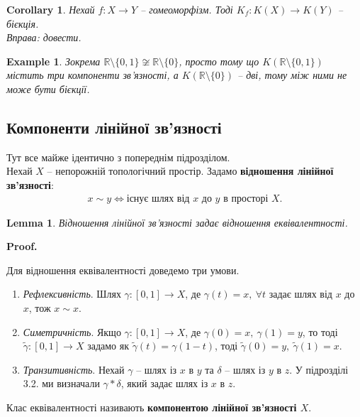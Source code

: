 \documentclass[a4paper, 10pt]{article}
\makeatletter
\theoremstyle{theoremdd}
\newtheorem{example}[theorem]{Example}
\newtheorem{lemma}[theorem]{Lemma}
\newtheorem{corollary}[theorem]{Corollary}
\renewenvironment{proof}[1][Proof.\\]{\par
\pushQED{\hfill \qed}%
\normalfont \topsep6\p@\@plus6\p@\relax
\trivlist
\item\relax
{\bfseries
#1\@addpunct{.}}\hspace\labelsep\ignorespaces
}{%
\popQED\endtrivlist\@endpefalse
}
\makeatother
\begin{document}
\begin{corollary}
Нехай $f \colon X \to Y$ -- гомеоморфізм. Тоді $K_f \colon K(X) \to K(Y)$ -- бієкція.\\
\textit{Вправа: довести.}
\end{corollary}

\begin{example}
Зокрема $\mathbb{R} \setminus \{0,1\} \not\cong \mathbb{R} \setminus \{0\}$, просто тому що $K(\mathbb{R} \setminus \{0,1\})$ містить три компоненти зв'язності, а $K(\mathbb{R} \setminus \{0\})$ -- дві, тому між ними не може бути бієкції.
\end{example}

\subsection{Компоненти лінійної зв'язності}
Тут все майже ідентично з попереднім підрозділом.\\
Нехай $X$ -- непорожній топологічний простір. Задамо \textbf{відношення лінійної зв'язності}:
\begin{align*}
x \sim y \iff \text{існує шлях від $x$ до $y$ в просторі $X$.}
\end{align*}

\begin{lemma}
Відношення лінійної зв'язності задає відношення еквівалентності.
\end{lemma}

\begin{proof}
Для відношення еквівалентності доведемо три умови.
\begin{enumerate}[nosep,wide=0pt,label={\Roman*.}]
\item \textit{Рефлексивність}. Шлях $\gamma \colon [0,1] \to X$, де $\gamma(t) = x,\ \forall t$ задає шлях від $x$ до $x$, тож $x \sim x$.
\item \textit{Симетричність}. Якщо $\gamma \colon [0,1] \to X$, де $\gamma(0) = x,\ \gamma(1) = y$, то тоді $\tilde{\gamma} \colon [0,1] \to X$ задамо як $\tilde{\gamma}(t) = \gamma(1-t)$, тоді $\tilde{\gamma}(0) = y,\ \tilde{\gamma}(1) = x$. 
\item \textit{Транзитивність}. Нехай $\gamma$ -- шлях із $x$ в $y$ та $\delta$ -- шлях із $y$ в $z$. У підрозділі 3.2. ми визначали $\gamma * \delta$, який задає шлях із $x$ в $z$. \qedhere
\end{enumerate}
\end{proof}
\noindent
Клас еквівалентності називають \textbf{компонентою лінійної зв'язності $X$}.
\end{document}
